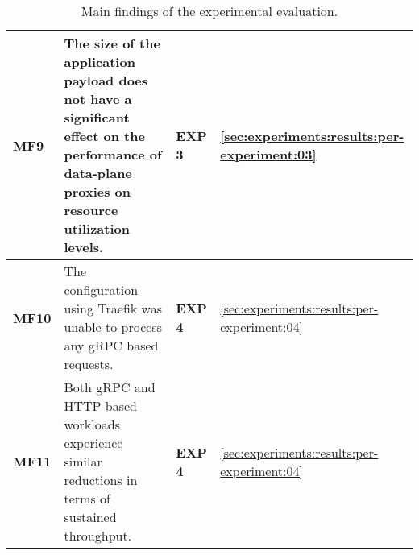 \begin{table}[!htbp]
\begin{tabularx}{\linewidth}{@{}lXll@{}}
\textbf{MF9} &
The size of the application payload does not have a significant effect on the performance of data-plane proxies on resource utilization levels. &
\textbf{EXP 3} &
\cref{sec:experiments:results:per-experiment:03} \\
\midrule  
  
\textbf{MF10} &
The configuration using Traefik was unable to process any gRPC based requests. &
\textbf{EXP 4} &
\cref{sec:experiments:results:per-experiment:04} \\
\midrule  
  
\textbf{MF11} &
Both gRPC and HTTP-based workloads experience similar reductions in terms of sustained throughput. &
\textbf{EXP 4} &
\cref{sec:experiments:results:per-experiment:04} \\ 
  
\bottomrule
\end{tabularx}

\caption[Main findings of the experimental evaluation]{Main findings of the experimental evaluation.}
\label{tab:experiment:main-fidings}
\end{table}